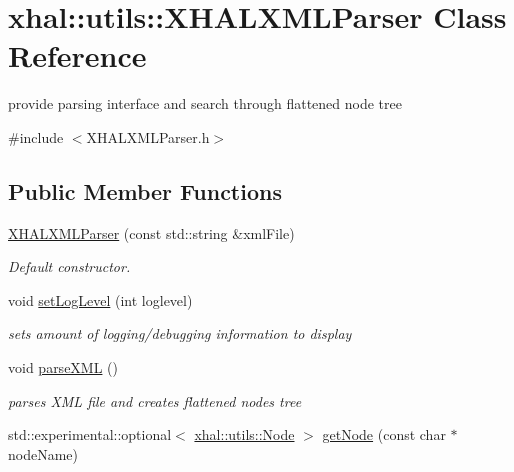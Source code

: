 \hypertarget{classxhal_1_1utils_1_1XHALXMLParser}{
\section{xhal::utils::XHALXMLParser Class Reference}
\label{classxhal_1_1utils_1_1XHALXMLParser}
}


provide parsing interface and search through flattened node tree  


{\ttfamily \#include $<$XHALXMLParser.h$>$}\subsection*{Public Member Functions}
\begin{DoxyCompactItemize}
\item 
\hyperlink{classxhal_1_1utils_1_1XHALXMLParser_a66d4932f44632ddc323db95fb6e0d7f0}{XHALXMLParser} (const std::string \&xmlFile)
\begin{DoxyCompactList}\small\item\em Default constructor. \item\end{DoxyCompactList}\item 
void \hyperlink{classxhal_1_1utils_1_1XHALXMLParser_af021ca1ffe51e9baf956ef7b9e0db8b9}{setLogLevel} (int loglevel)
\begin{DoxyCompactList}\small\item\em sets amount of logging/debugging information to display \item\end{DoxyCompactList}\item 
\hypertarget{classxhal_1_1utils_1_1XHALXMLParser_a2ccbec8d523175812d51af368ff22b03}{
void \hyperlink{classxhal_1_1utils_1_1XHALXMLParser_a2ccbec8d523175812d51af368ff22b03}{parseXML} ()}
\label{classxhal_1_1utils_1_1XHALXMLParser_a2ccbec8d523175812d51af368ff22b03}

\begin{DoxyCompactList}\small\item\em parses XML file and creates flattened nodes tree \item\end{DoxyCompactList}\item 
\hypertarget{classxhal_1_1utils_1_1XHALXMLParser_ad3d09d7354fc6b1ca4e6588d243a3b5a}{
std::experimental::optional$<$ \hyperlink{classxhal_1_1utils_1_1Node}{xhal::utils::Node} $>$ \hyperlink{classxhal_1_1utils_1_1XHALXMLParser_ad3d09d7354fc6b1ca4e6588d243a3b5a}{getNode} (const char $\ast$nodeName)}
\label{classxhal_1_1utils_1_1XHALXMLParser_ad3d09d7354fc6b1ca4e6588d243a3b5a}


\end{DoxyCompactItemize}
